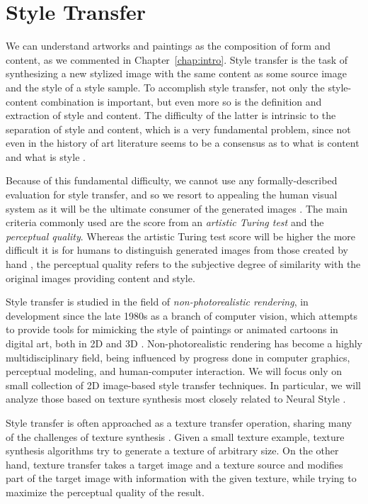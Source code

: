 \section{Style Transfer}
\label{sec:context:style-transfer}

We can understand artworks and paintings as the composition of form and content, as we commented in Chapter~\ref{chap:intro}.
Style transfer is the task of synthesizing a new stylized image with the same content as some source image and the style of a style sample.
To accomplish style transfer, not only the style-content combination is important, but even more so is the definition and extraction of style and content.
The difficulty of the latter is intrinsic to the separation of style and content, which is a very fundamental problem, since not even in the history of art literature seems to be a consensus as to what is content and what is style \cite{Xie2007}.

Because of this fundamental difficulty, we cannot use any formally-described evaluation for style transfer, and so we resort to appealing the human visual system as it will be the ultimate consumer of the generated images \cite{Lin2011}.
The main criteria commonly used are the score from an \emph{artistic Turing test} and the \emph{perceptual quality}.
Whereas the artistic Turing test score will be higher the more difficult it is for humans to distinguish generated images from those created by hand \cite{Kyprianidis2013}, the perceptual quality refers to the subjective degree of similarity with the original images providing content and style.

Style transfer is studied in the field of \emph{non-photorealistic rendering}, in development since the late 1980s as a branch of computer vision, which attempts to provide tools for mimicking the style of paintings or animated cartoons in digital art, both in 2D and 3D \cite{Lee2010, Kyprianidis2013}.
Non-photorealistic rendering has become a highly multidisciplinary field, being influenced by progress done in computer graphics, perceptual modeling, and human-computer interaction.
We will focus only on small collection of 2D image-based style transfer techniques.
In particular, we will analyze those based on texture synthesis most closely related to Neural Style \cite{Gatys2015B}.

Style transfer is often approached as a texture transfer operation, sharing many of the challenges of texture synthesis \cite{Ashikhmin2003}.
Given a small texture example, texture synthesis algorithms try to generate a texture of arbitrary size.
On the other hand, texture transfer takes a target image and a texture source and modifies part of the target image with information with the given texture, while trying to maximize the perceptual quality of the result.

